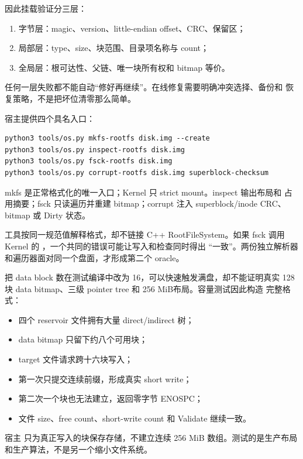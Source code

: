 因此挂载验证分三层：

\begin{enumerate}
  \item 字节层：magic、version、little-endian offset、CRC、保留区；
  \item 局部层：type、size、块范围、目录项名称与 count；
  \item 全局层：根可达性、父链、唯一块所有权和 bitmap 等价。
\end{enumerate}

任何一层失败都不能自动“修好再继续”。在线修复需要明确冲突选择、备份和
恢复策略，不是把坏位清零那么简单。

宿主提供四个具名入口：

\begin{lstlisting}[caption={rootfs v2 独立工具}]
python3 tools/os.py mkfs-rootfs disk.img --create
python3 tools/os.py inspect-rootfs disk.img
python3 tools/os.py fsck-rootfs disk.img
python3 tools/os.py corrupt-rootfs disk.img superblock-checksum
\end{lstlisting}

mkfs 是正常格式化的唯一入口；Kernel 只 strict mount。inspect 输出布局和
占用摘要；fsck 只读遍历并重建 bitmap；corrupt 注入 superblock/inode CRC、
bitmap 或 Dirty 状态。

工具按同一规范值解释格式，却不链接 C++ RootFileSystem。如果 fsck 调用
Kernel 的 ，一个共同的错误可能让写入和检查同时得出
“一致”。两份独立解析器和遍历器面对同一个盘面，才形成第二个 oracle。

把 data block 数在测试编译中改为 16，可以快速触发满盘，却不能证明真实
128 块 data bitmap、三级 pointer tree 和 256 MiB布局。容量测试因此构造
完整格式：

\begin{itemize}
  \item 四个 reservoir 文件拥有大量 direct/indirect 树；
  \item data bitmap 只留下约八个可用块；
  \item target 文件请求跨十六块写入；
  \item 第一次只提交连续前缀，形成真实 short write；
  \item 第二次一个块也无法建立，返回零字节 ENOSPC；
  \item 文件 size、free count、short-write count 和 Validate 继续一致。
\end{itemize}

宿主  只为真正写入的块保存存储，不建立连续
256 MiB 数组。测试的是生产布局和生产算法，不是另一个缩小文件系统。

